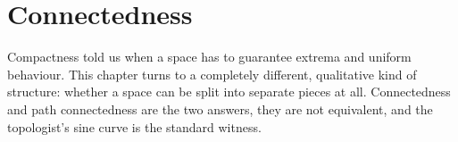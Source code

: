 \chapter{Connectedness}
\label{ch:connectedness}

Compactness told us when a space has  to guarantee extrema and uniform
behaviour. This chapter turns to a completely different, qualitative kind of structure: whether a
space can be split into separate pieces at all. Connectedness and path connectedness are the two
answers, they are not equivalent, and the topologist's sine curve is the standard witness.




